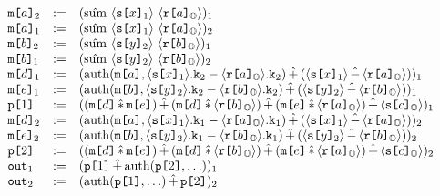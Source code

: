 $$
\begin{array}{lcl}
  \elab{\mesg{a}}{2} &:=&
  \elab{(\macotp\ \macgv{\elab{\secret{x}}{1}}\ \macgv{\elab{\flip{a}}{\Oracle}})}{1}\\
  \elab{\mesg{a}}{1} &:=&
  \elab{(\macotp\ \macgv{\elab{\secret{x}}{1}}\ \macgv{\elab{\flip{a}}{\Oracle}})}{2}\\
  \elab{\mesg{b}}{2} &:=&
  \elab{(\macotp\ \macgv{\elab{\secret{y}}{2}}\ \macgv{\elab{\flip{b}}{\Oracle}})}{1}\\
  \elab{\mesg{b}}{1} &:=&
  \elab{(\macotp\ \macgv{\elab{\secret{y}}{2}}\ \macgv{\elab{\flip{b}}{\Oracle}})}{2}\\
  \elab{\mesg{d}}{1} &:=&
  \elab{(\macauth(\mesg{a}, \mack{\elab{\secret{x}}{1}}{2} \fminus \mack{\elab{\flip{a}}{\Oracle}}{2}) \macplus (\macgv{\elab{\secret{x}}{1}}\macminus\macgv{\elab{\flip{a}}{\Oracle}}))}{1}\\
  \elab{\mesg{e}}{1}&:=&
  \elab{(\macauth(\mesg{b}, \mack{\elab{\secret{y}}{2}}{2} \fminus \mack{\elab{\flip{b}}{\Oracle}}{2}) \macplus (\macgv{\elab{\secret{y}}{2}}\macminus\macgv{\elab{\flip{b}}{\Oracle}}))}{1}\\
  \rvl{1} &:=&
  \elab{( (\mesg{d} \mactimes \mesg{e}) \macplus
          (\mesg{d} \mactimes \macgv{\elab{\flip{b}}{\Oracle}}) \macplus
          (\mesg{e} \mactimes \macgv{\elab{\flip{a}}{\Oracle}}) \macplus \macgv{\elab{\secret{c}}{\Oracle}}
    )}{1}\\
  \elab{\mesg{d}}{2} &:=&
  \elab{(\macauth(\mesg{a}, \mack{\elab{\secret{x}}{1}}{1} \fminus \mack{\elab{\flip{a}}{\Oracle}}{1}) \macplus (\macgv{\elab{\secret{x}}{1}}\macminus\macgv{\elab{\flip{a}}{\Oracle}}))}{2}\\
  \elab{\mesg{e}}{2}&:=&
  \elab{(\macauth(\mesg{b}, \mack{\elab{\secret{y}}{2}}{1} \fminus \mack{\elab{\flip{b}}{\Oracle}}{1}) \macplus (\macgv{\elab{\secret{y}}{2}}\macminus\macgv{\elab{\flip{b}}{\Oracle}}))}{2}\\
  \rvl{2} &:=&
  \elab{( (\mesg{d} \mactimes \mesg{e}) \macplus
          (\mesg{d} \mactimes \macgv{\elab{\flip{b}}{\Oracle}}) \macplus
          (\mesg{e} \mactimes \macgv{\elab{\flip{a}}{\Oracle}}) \macplus \macgv{\elab{\secret{c}}{\Oracle}}
    )}{2}\\
  \out{1} &:=& \elab{(\rvl{1} \macplus \macauth(\rvl{2},\ldots))}{1} \\
  \out{2} &:=& \elab{(\macauth(\rvl{1},\ldots) \macplus \rvl{2})}{2}
\end{array}
$$


